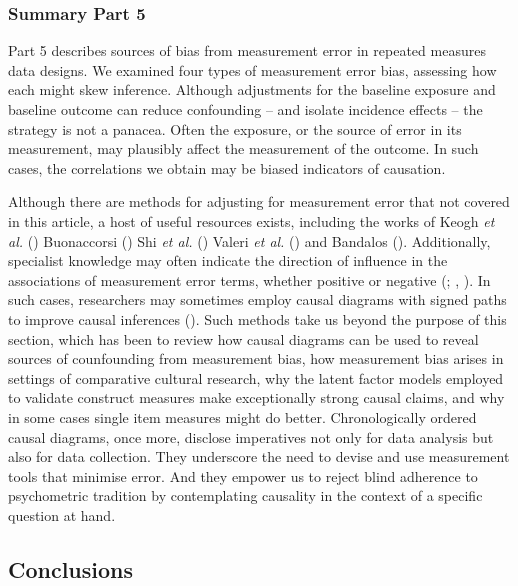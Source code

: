 \documentclass[
  singlecolumn]{article}
\begin{document}
\subsubsection{Summary Part 5}\label{summary-part-5}

Part 5 describes sources of bias from measurement error in repeated
measures data designs. We examined four types of measurement error bias,
assessing how each might skew inference. Although adjustments for the
baseline exposure and baseline outcome can reduce confounding -- and
isolate incidence effects -- the strategy is not a panacea. Often the
exposure, or the source of error in its measurement, may plausibly
affect the measurement of the outcome. In such cases, the correlations
we obtain may be biased indicators of causation.

Although there are methods for adjusting for measurement error that not
covered in this article, a host of useful resources exists, including
the works of Keogh \emph{et al.} ()
Buonaccorsi () Shi \emph{et al.}
() Valeri \emph{et al.}
() and Bandalos
(). Additionally, specialist knowledge
may often indicate the direction of influence in the associations of
measurement error terms, whether positive or negative
(;
,
). In such cases, researchers may
sometimes employ causal diagrams with signed paths to improve causal
inferences (). Such methods take us beyond the purpose of this section, which
has been to review how causal diagrams can be used to reveal sources of
counfounding from measurement bias, how measurement bias arises in
settings of comparative cultural research, why the latent factor models
employed to validate construct measures make exceptionally strong causal
claims, and why in some cases single item measures might do better.
Chronologically ordered causal diagrams, once more, disclose imperatives
not only for data analysis but also for data collection. They underscore
the need to devise and use measurement tools that minimise error. And
they empower us to reject blind adherence to psychometric tradition by
contemplating causality in the context of a specific question at hand.

\subsection{Conclusions}\label{conclusions}
\end{document}

